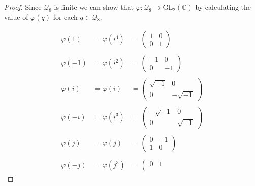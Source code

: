 \documentclass[10pt]{article}
\newcommand{\bb}[1]{\mathbb{#1}}
\theoremstyle{plain}
\theoremstyle{remark}
\begin{document}
\begin{proof}
  Since $\mathcal{Q}_8$ is finite we can show that $\varphi:\mathcal{Q}_8\rightarrow \text{GL}_2(\bb{C})$
  by calculating the value of $\varphi(q)$ for each $q\in\mathcal{Q}_8$.

  \[
    \begin{array}{ccc}
      
      \varphi(1)  &= \varphi(i^4) &=
                       \left(\begin{array}{cc}
                               1&0\\
                               0&1
                             \end{array}\right)\\\\
      \varphi(-1) &= \varphi(i^2) &=
                       \left(\begin{array}{cc}
                               -1&0\\
                               0&-1
                             \end{array}\right)\\\\
      \varphi(i)  &= \varphi(i)  &=
                       \left(\begin{array}{cc}
                               \sqrt{-1}&0\\
                               0&-\sqrt{-1}
                             \end{array}\right)\\\\
      \varphi(-i) &= \varphi(i^3) &=
                       \left(\begin{array}{cc}
                               -\sqrt{-1}&0\\
                               0&\sqrt{-1}
                             \end{array}\right)\\\\
      \varphi(j)  &= \varphi(j)  &=
                       \left(\begin{array}{cc}
                               0&-1\\
                               1&0
                             \end{array}\right)\\\\
      \varphi(-j) &= \varphi(j^3) &=
                       \left(\begin{array}{cc}
                               0&1\\

\end{array}
\end{array}\]
\end{proof}
\end{document}
